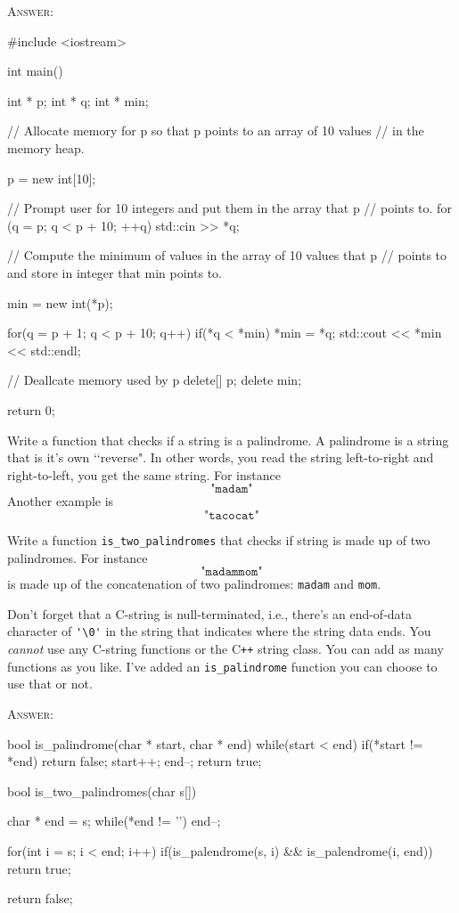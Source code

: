 \textsc{Answer:}
\begin{answercode}
#include <iostream>

int main()
{
    int * p;
    int * q;
    int * min; 

    // Allocate memory for p so that p points to an array of 10 values
    // in the memory heap.

    p = new int[10];
    
    // Prompt user for 10 integers and put them in the array that p
    // points to.
    for (q = p; q < p + 10; ++q)
    {
      std::cin >> *q;
    }

    // Compute the minimum of values in the array of 10 values that p
    // points to and store in integer that min points to.

    min = new int(*p);


    for(q = p + 1; q < p + 10; q++)
    {
      if(*q < *min)
      {
        *min = *q;
      }
    }
    std::cout << *min << std::endl;

    // Deallcate memory used by p
    delete[] p;
    delete min;

    return 0;
}
\end{answercode}


\newpage
\nextq
Write a function that checks if a string is a palindrome.
A palindrome is a string that is it’s own \lq\lq reverse".
In other words, you read the string left-to-right and right-to-left,
you get the same string. For instance
\[
	\texttt{"madam"}
\]
Another example is 
\[
	\texttt{"tacocat"}
\]

Write a function \verb!is_two_palindromes!
that checks if string is made up of two palindromes.
For instance
\[
\texttt{"madammom"}
\]
is made up of the concatenation of two palindromes: \texttt{madam} and
\texttt{mom}.

Don’t forget that a C-string is null-terminated, i.e.,
there’s an end-of-data character of \verb!'\0'! in the string that indicates
where the string data ends.
You \textit{cannot} use any C-string functions or the C\texttt{++} string class.
You can add as many functions as you like.
I've added an \verb!is_palindrome! function you can choose to use that or not.

\textsc{Answer:}
\begin{answercode}
bool is_palindrome(char * start, char * end)
{
  while(start < end)
  {
    if(*start != *end) return false;
    start++;
    end--;
  }
  return true;
}

bool is_two_palindromes(char s[])
{
  char * end = s;
  while(*end != '\0')
  {
    end--;
  }

  for(int i = s; i < end; i++)
  {
    if(is_palendrome(s, i) && is_palendrome(i, end)) return true;
  }

  return false;
}
\end{answercode}


